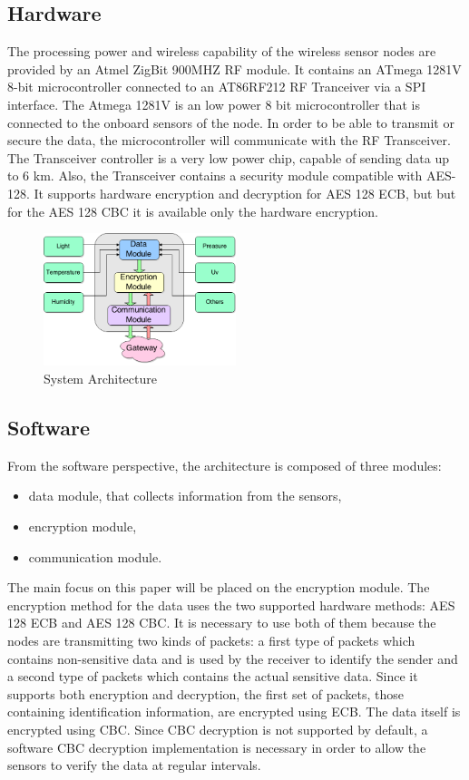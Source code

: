 \label{chap:arch}
\subsection{Hardware}

The processing power and wireless capability of the wireless sensor nodes are provided by an Atmel
ZigBit 900MHZ RF module. It contains an ATmega 1281V 8-bit microcontroller connected to an
AT86RF212 RF Tranceiver via a SPI interface. The Atmega 1281V is an low power 8 bit microcontroller
that is connected to the onboard sensors of the node. In order to be able to transmit or secure the
data, the microcontroller will communicate with the RF Transceiver. The Transceiver controller is a very low power chip,
capable of sending data up to 6 km. Also, the Transceiver contains a security module compatible
with AES-128. It supports hardware encryption and decryption for AES 128 ECB, but but for the AES
128 CBC it is available only the hardware encryption.


\begin{figure}[ht] \centering
  \includegraphics[width=0.5\textwidth]{img/wsn-soa-system-arch.png}
  \caption{System Architecture}
\end{figure}

\subsection{Software}

From the software perspective, the architecture is composed of three modules:
\begin{itemize}
\item data module, that
collects information from the sensors,
\item encryption module,
\item communication module.
\end{itemize}

The main focus on this paper will be placed on the encryption module.
The encryption method for the data uses the two supported hardware methods: AES 128 ECB
and AES 128 CBC. It is necessary to use both of them because the nodes are transmitting 
two kinds of packets: a first type of packets which contains non-sensitive data and is used by the
receiver to identify the sender and a second type of packets which contains the actual sensitive data. Since it supports 
both encryption and decryption, the first set of packets, those containing identification
information, are encrypted using ECB. The data itself is encrypted using CBC. Since CBC 
decryption is not supported by default, a software CBC decryption implementation is necessary in order to allow the sensors to verify the data at regular intervals.

